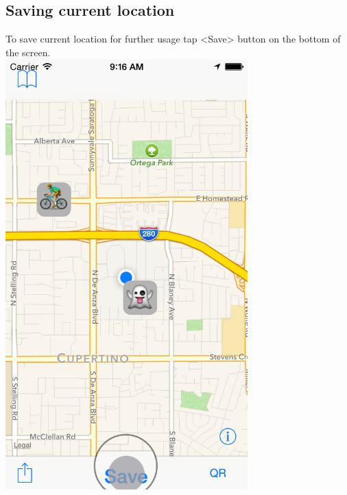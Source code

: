 \documentclass[12pt]{article}
\begin{document}
\begin{center}

\section{Saving current location}

To save current location for further usage tap <Save> button on the bottom of the screen. \\[3mm]

\includegraphics[width=0.7\textwidth]{../images/1_tap_to_save_place.png}


\end{center}
\end{document}
